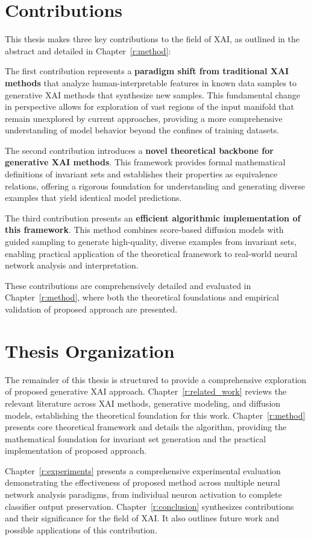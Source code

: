 \section{Contributions}

This thesis makes three key contributions to the field of XAI, as outlined in the abstract and detailed in Chapter~\ref{r:method}:

The first contribution represents a \textbf{paradigm shift from traditional XAI methods} that analyze human-interpretable features in known data samples to generative XAI methods that synthesize new samples. This fundamental change in perspective allows for exploration of vast regions of the input manifold that remain unexplored by current approaches, providing a more comprehensive understanding of model behavior beyond the confines of training datasets.

The second contribution introduces a \textbf{novel theoretical backbone for generative XAI methods}. This framework provides formal mathematical definitions of invariant sets and establishes their properties as equivalence relations, offering a rigorous foundation for understanding and generating diverse examples that yield identical model predictions.

The third contribution presents an \textbf{efficient algorithmic implementation of this framework}. This method combines score-based diffusion models with guided sampling to generate high-quality, diverse examples from invariant sets, enabling practical application of the theoretical framework to real-world neural network analysis and interpretation.

These contributions are comprehensively detailed and evaluated in Chapter~\ref{r:method}, where both the theoretical foundations and empirical validation of proposed approach are presented.

\section{Thesis Organization}

The remainder of this thesis is structured to provide a comprehensive exploration of proposed generative XAI approach. Chapter~\ref{r:related_work} reviews the relevant literature across XAI methods, generative modeling, and diffusion models, establishing the theoretical foundation for this work. Chapter~\ref{r:method} presents core theoretical framework and details the \method{} algorithm, providing the mathematical foundation for invariant set generation and the practical implementation of proposed approach.

Chapter~\ref{r:experiments} presents a comprehensive experimental evaluation demonstrating the effectiveness of proposed method across multiple neural network analysis paradigms, from individual neuron activation to complete classifier output preservation. Chapter~\ref{r:conclusion} synthesizes contributions and their significance for the field of XAI. It also outlines future work and possible applications of this contribution.
